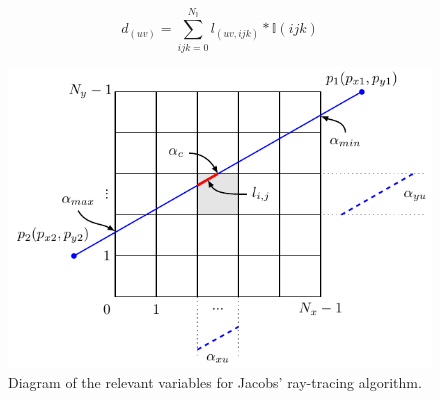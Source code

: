 \begin{equation}
d_{(uv)}= \sum_{ijk=0}^{N_\mathbb{I}}l_{(uv,ijk)}*\mathbb{I}(ijk)
\label{eq:ray-voxel}
\end{equation}


\begin{figure}
\begin{center}

\includegraphics{GPUmethods/Amatrix_siddon_diagram.pdf} 
\end{center}

\caption[Jacob's ray tracing diagram]{\label{fig:Siddon} Diagram of the relevant variables for Jacobs' ray-tracing algorithm.} 
\end{figure}



